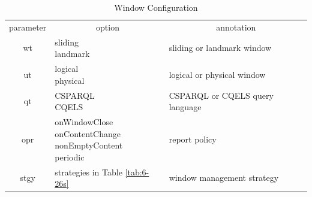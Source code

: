 \begin{table}[!htbp]
	\centering
    \caption{Window Configuration}
    \label{tab:6-wc}
    \begin{tabular}{|c||l|l|} \hline
    parameter & \multicolumn{1}{c|}{option} & \multicolumn{1}{c|}{annotation} \\ \hhline{|=#=|=|}
    wt & \makecell[l]{sliding \\ landmark} & sliding or landmark window \\ \hline
    ut & \makecell[l]{logical \\ physical} & logical or physical window \\ \hline
    qt & \makecell[l]{CSPARQL \\ CQELS} & CSPARQL or CQELS query language \\ \hline
    opr & \makecell[l]{onWindowClose \\ onContentChange \\ nonEmptyContent \\ periodic} & report policy \\ \hline 
    stgy & strategies in Table \ref{tab:6-26s} & window management strategy \\ \hline
    \end{tabular}
\end{table}
%
